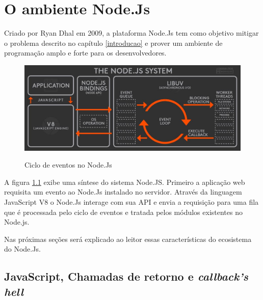 \chapter{O ambiente Node.Js}
\label{ambiente-node-js}



  Criado por Ryan Dhal em 2009, a plataforma Node.Js tem como objetivo mitigar o problema descrito no capítulo \ref{introducao}
  e prover um ambiente de programação amplo e forte para os desenvolvedores. 
  
    \begin{figure}[H]
    \setlength{\abovecaptionskip}{0pt}
    \setlength{\belowcaptionskip}{0pt}
    \caption[Ciclo de eventos no Node.Js]{Ciclo de eventos no Node.Js}
    \centering
    \includegraphics[width=.85\textwidth]{imagem/node-js-system-twitter-BusyRich.png}
    \captionsetup{justification=centering}
    \label{fig:node-js-system-loop}
  \end{figure}
  
  A figura \ref{fig:node-js-system-loop} exibe uma síntese do sistema Node.JS. Primeiro a aplicação web requisita um evento 
  ao Node.Js instalado no servidor. Através da linguagem JavaScript V8 o Node.Js interage com sua \ac{API} e envia 
  a requisição para uma fila que é processada pelo ciclo de eventos e tratada pelos módulos existentes no Node.js. 
  
  Nas próximas seções será explicado ao leitor essas características do ecosistema do Node.Js.
 
\section{JavaScript, Chamadas de retorno e \textit{callback's hell}}
\label{chamadas-de-retorno-e-callback-hell}

